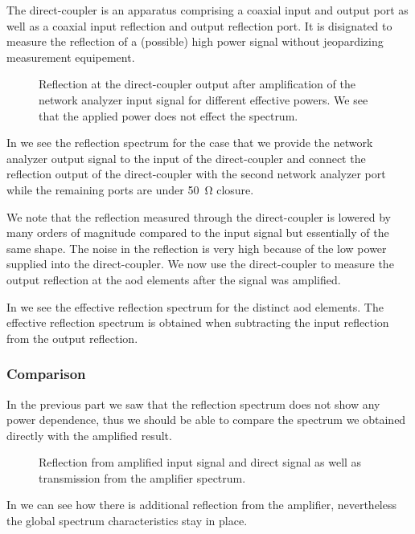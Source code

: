 The direct-coupler is an apparatus comprising a coaxial input and output
port as well as a coaxial input reflection and output reflection port. It is
disignated to measure the reflection of a (possible) high power signal
without jeopardizing measurement equipement.
\begin{figure}[htb]
  \centering
  \begin{adjustbox}{width=\textwidth}
    
  \end{adjustbox}
  \caption{Reflection at the direct-coupler output after amplification of the
  network analyzer input signal for different effective powers. We see that
the applied power does not effect the spectrum.
}\label{fig:signal_reflection_coupled}
\end{figure}
In  we see the reflection spectrum for
the case that we provide the network analyzer output signal to the input of
the direct-coupler and connect the reflection output of the direct-coupler
with the second network analyzer port while the remaining ports are under
\SI{50}{\ohm} closure.

We note that the reflection measured through the direct-coupler is lowered
by many orders of magnitude compared to the input signal but essentially of
the same shape. The noise in the reflection is very high because of the low
power supplied into the direct-coupler. We now use the direct-coupler to
measure the output reflection at the
\gls{aod} elements after the signal was amplified.

In  we see the effective reflection
spectrum for the distinct \gls{aod} elements. The effective reflection
spectrum is obtained when subtracting the input reflection from the output
reflection.

\subsubsection{Comparison}

In the previous part we saw that the reflection spectrum does not show any
power dependence, thus we should be able to compare the spectrum we obtained
directly with the amplified result.
\begin{figure}[htb]
  \centering
  \begin{adjustbox}{width=\textwidth}
    
  \end{adjustbox}
  \caption{Reflection from amplified input signal and direct signal as well as
    transmission from the amplifier spectrum.
  }\label{fig:signal_reflection_comparison}
\end{figure}
In  we can see how there is additional
reflection from the amplifier, nevertheless the global spectrum
characteristics stay in place.

